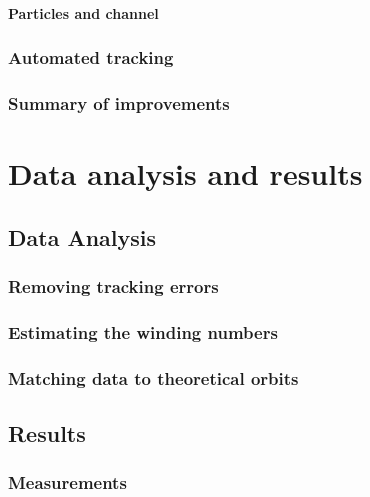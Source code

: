 \documentclass[]{report}
\begin{document}
\subsection{Particles and channel}




\section{Automated tracking}
     

\section{Summary of improvements}



\part{Data analysis and results}
\chapter{Data Analysis}


\section{Removing tracking errors}


\section{Estimating the winding numbers}


\section{Matching data to theoretical orbits}




\chapter{Results}

\section{Measurements}

\end{document}
